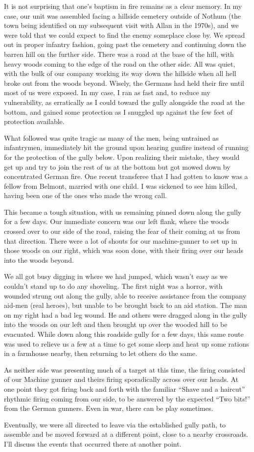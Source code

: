 \documentclass[../m3y]{subfiles}
\begin{document}
It is not surprising that one's baptism in fire remains as a clear memory. In my case, our unit was assembled facing a hillside cemetery outside of Nothum (the town being identified on my subsequent visit with Allan in the 1970s), and we were told that we could expect to find the enemy someplace close by. We spread out in proper infantry fashion, going past the cemetery and continuing down the barren hill on the further side. There was a road at the base of the hill, with heavy woods coming to the edge of the road on the other side. All was quiet, with the bulk of our company working its way down the hillside when all hell broke out from the woods beyond. Wisely, the Germans had held their fire until most of us were exposed. In my case, I ran as fast and, to reduce my vulnerability, as erratically as I could toward the gully alongside the road at the bottom, and gained some protection as I snuggled up against the few feet of protection available.

What followed was quite tragic as many of the men, being untrained as infantrymen, immediately hit the ground upon hearing gunfire instead of running for the protection of the gully below. Upon realizing their mistake, they would get up and try to join the rest of us at the bottom but got mowed down by concentrated German fire. One recent transferee that I had gotten to know was a fellow from Belmont, married with one child. I was sickened to see him killed, having been one of the ones who made the wrong call.

This became a tough situation, with us remaining pinned down along the gully for a few days. Our immediate concern was our left flank, where the woods crossed over to our side of the road, raising the fear of their coming at us from that direction. There were a lot of shouts for our machine-gunner to set up in those woods on our right, which was soon done, with their firing over our heads into the woods beyond.

We all got busy digging in where we had jumped, which wasn't easy as we couldn't stand up to do any shoveling. The first night was a horror, with wounded strung out along the gully, able to receive assistance from the company aid-men (real heroes), but unable to be brought back to an aid station. The man on my right had a bad leg wound. He and others were dragged along in the gully into the woods on our left and then brought up over the wooded hill to be evacuated. While down along this roadside gully for a few days, this same route was used to relieve us a few at a time to get some sleep and heat up some rations in a farmhouse nearby, then returning to let others do the same.

As neither side was presenting much of a target at this time, the firing consisted of our
Machine gunner and theirs firing sporadically across over our heads. At one point they got
firing back and forth with the familiar ``Shave and a haircut'' rhythmic firing coming from our side, to be answered by the expected ``Two bits!'' from the German gunners. Even in war, there can be play sometimes.

Eventually, we were all directed to leave via the established gully path, to assemble and be moved forward at a different point, close to a nearby crossroads. I'll discuss the events that occurred there at another point.
\end{document}
